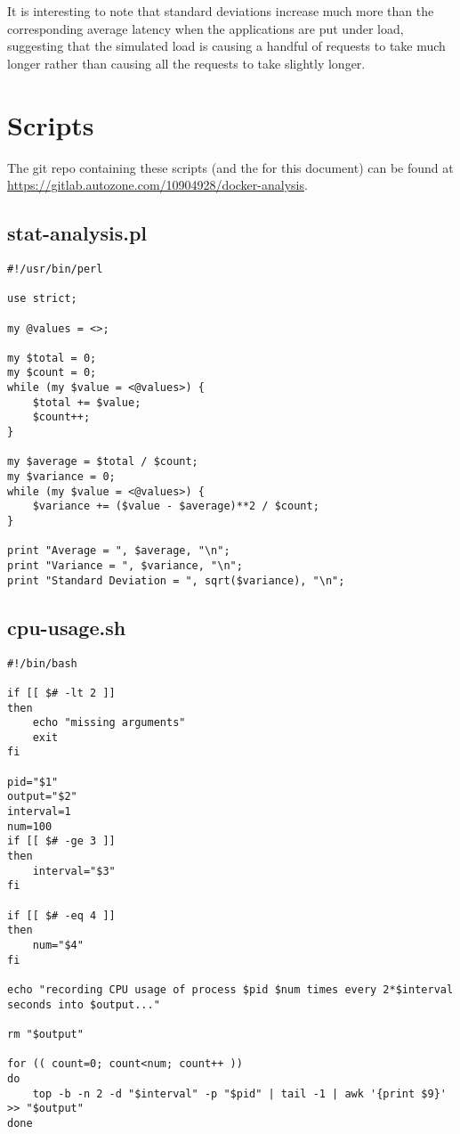 \documentclass{article}
\begin{document}
It is interesting to note that standard deviations increase much more than the corresponding average latency when the applications are put under load, suggesting that the simulated load is causing a handful of requests to take much longer rather than causing all the requests to take slightly longer.

\section{Scripts}
The git repo containing these scripts (and the \latex for this document) can be found at \href{https://gitlab.autozone.com/10904928/docker-analysis}{https://gitlab.autozone.com/10904928/docker-analysis}.

\subsection{stat-analysis.pl}
\begin{verbatim}
#!/usr/bin/perl

use strict;

my @values = <>;

my $total = 0;
my $count = 0;
while (my $value = <@values>) {
    $total += $value;
    $count++;
}

my $average = $total / $count;
my $variance = 0;
while (my $value = <@values>) {
    $variance += ($value - $average)**2 / $count;
}

print "Average = ", $average, "\n";
print "Variance = ", $variance, "\n";
print "Standard Deviation = ", sqrt($variance), "\n";
\end{verbatim}

\subsection{cpu-usage.sh}
\begin{verbatim}
#!/bin/bash

if [[ $# -lt 2 ]]
then
    echo "missing arguments"
    exit
fi

pid="$1"
output="$2"
interval=1
num=100
if [[ $# -ge 3 ]]
then
    interval="$3"
fi

if [[ $# -eq 4 ]]
then
    num="$4"
fi

echo "recording CPU usage of process $pid $num times every 2*$interval seconds into $output..."

rm "$output"

for (( count=0; count<num; count++ ))
do
    top -b -n 2 -d "$interval" -p "$pid" | tail -1 | awk '{print $9}' >> "$output"
done
\end{verbatim}
\end{document}
